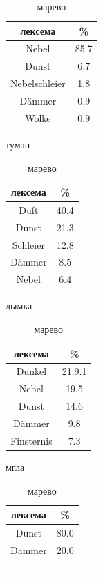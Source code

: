 \begin{table}[H]
\vspace{+15pt}
\begin{small}
\centering
\parbox{.24\linewidth}{
\centering
\begin{tabular}{c|c}
\hline
лексема&\%\\
\hline
Nebel&85.7\\
Dunst&6.7\\
Nebelschleier&1.8\\
Dämmer&0.9\\
Wolke&0.9\\
\hline
\end{tabular}
\caption{туман}
\label{tumande}
}
\parbox{.24\linewidth}{
\centering
\begin{tabular}{c|c}
\hline
лексема&\%\\
\hline
Duft&40.4\\
Dunst&21.3\\
Schleier&12.8\\
Dämmer&8.5\\
Nebel&6.4\\
\hline
\end{tabular}
\caption{дымка}
\label{dymkade}
}
\parbox{.26\linewidth}{
\centering
\begin{tabular}{c|c}
\hline
лексема&\%\\
\hline
Dunkel&21.9.1\\
Nebel&19.5\\
Dunst&14.6\\
Dämmer&9.8\\
Finsternis&7.3\\
\hline
\end{tabular}
\caption{мгла}
\label{mglade}
}
\parbox{.24\linewidth}{
\centering
\begin{tabular}{c|c}
\hline
лексема&\%\\
\hline
Dunst&80.0\\
Dämmer&20.0\\
\\
\\
\\
\hline
\end{tabular}
\caption{марево}
\label{marevode}
}
\end{small}
\end{table}

